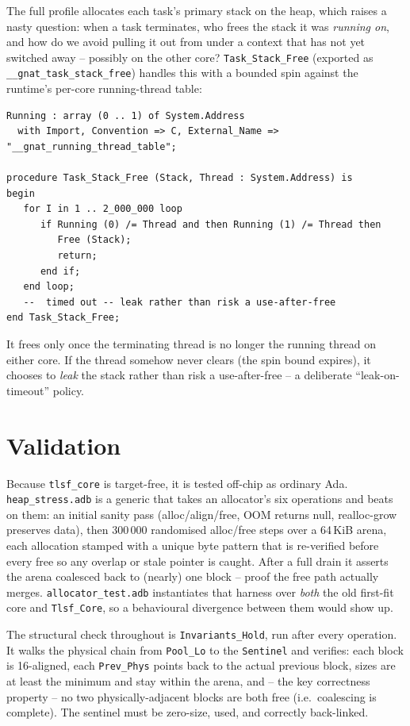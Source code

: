The full profile allocates each task's primary stack on the heap, which raises a
nasty question: when a task terminates, who frees the stack it was \emph{running
on}, and how do we avoid pulling it out from under a context that has not yet
switched away -- possibly on the other core? \texttt{Task\_Stack\_Free}
(exported as \texttt{\_\_gnat\_task\_stack\_free}) handles this with a bounded
spin against the runtime's per-core running-thread table:

\begin{lstlisting}
Running : array (0 .. 1) of System.Address
  with Import, Convention => C, External_Name => "__gnat_running_thread_table";

procedure Task_Stack_Free (Stack, Thread : System.Address) is
begin
   for I in 1 .. 2_000_000 loop
      if Running (0) /= Thread and then Running (1) /= Thread then
         Free (Stack);
         return;
      end if;
   end loop;
   --  timed out -- leak rather than risk a use-after-free
end Task_Stack_Free;
\end{lstlisting}

It frees only once the terminating thread is no longer the running thread on
either core. If the thread somehow never clears (the spin bound expires), it
chooses to \emph{leak} the stack rather than risk a use-after-free -- a deliberate
``leak-on-timeout'' policy.

\section{Validation}
\label{sec:heap-validation}

Because \texttt{tlsf\_core} is target-free, it is tested off-chip as ordinary Ada.
\texttt{heap\_stress.adb} is a generic that takes an allocator's six operations
and beats on them: an initial sanity pass (alloc/align/free, OOM returns null,
realloc-grow preserves data), then 300\,000 randomised alloc/free steps over a
64\,KiB arena, each allocation stamped with a unique byte pattern that is
re-verified before every free so any overlap or stale pointer is caught. After a
full drain it asserts the arena coalesced back to (nearly) one block -- proof the
free path actually merges. \texttt{allocator\_test.adb} instantiates that harness
over \emph{both} the old first-fit core and \texttt{Tlsf\_Core}, so a behavioural
divergence between them would show up.

The structural check throughout is \texttt{Invariants\_Hold}, run after every
operation. It walks the physical chain from \texttt{Pool\_Lo} to the
\texttt{Sentinel} and verifies: each block is 16-aligned, each
\texttt{Prev\_Phys} points back to the actual previous block, sizes are at least
the minimum and stay within the arena, and -- the key correctness property -- no
two physically-adjacent blocks are both free (i.e.\ coalescing is complete). The
sentinel must be zero-size, used, and correctly back-linked.

